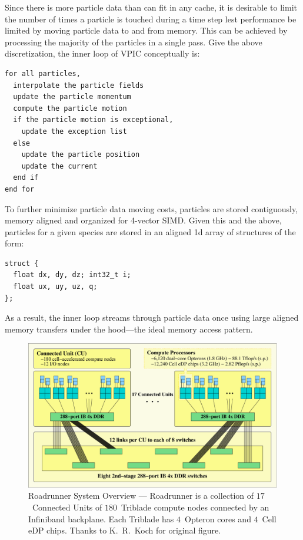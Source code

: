 \documentclass[journal,twoside]{IEEEtran}
\begin{document}
Since there is more particle data than can fit in any cache, it is
desirable to limit the number of times a particle is touched during a
time step lest performance be limited by moving particle data to and
from memory.  This can be achieved by processing the majority of the
particles in a single pass.  Give the above discretization, the inner
loop of VPIC conceptually is:
\begin{verbatim}
for all particles,
  interpolate the particle fields
  update the particle momentum
  compute the particle motion
  if the particle motion is exceptional,
    update the exception list
  else
    update the particle position
    update the current
  end if
end for
\end{verbatim}
To further minimize particle data moving costs, particles are stored
contiguously, memory aligned and organized for 4-vector SIMD.  Given
this and the above, particles for a given species are stored in an
aligned 1d array of structures of the form:
\begin{verbatim}
struct {
  float dx, dy, dz; int32_t i;
  float ux, uy, uz, q;
};
\end{verbatim}
As a result, the inner loop streams through particle data once using
large aligned memory transfers under the hood---the ideal memory
access pattern.

\begin{figure}
\begin{center}
\includegraphics[width=7in]{figs/system.eps}
\caption{Roadrunner System Overview --- Roadrunner is a collection
of $17$~Connected Units of $180$~Triblade compute nodes connected by
an Infiniband backplane.  Each Triblade has $4$~Opteron cores and
$4$~Cell eDP chips. Thanks to K.~R.~Koch for original figure.}
\label{fig:system}
\end{center}
\end{figure}
\end{document}
